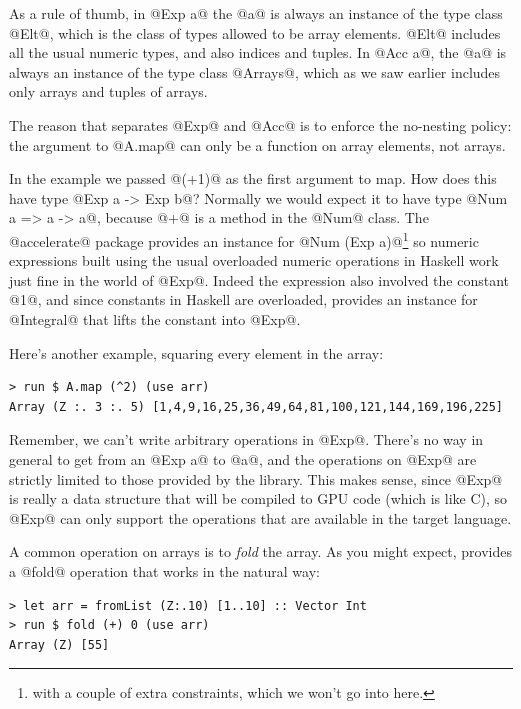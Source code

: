 As a rule of thumb, in @Exp a@ the @a@ is always an instance of the
type class @Elt@, which is the class of types allowed to be array
elements.  @Elt@ includes all the usual numeric types, and also
indices and tuples.  In @Acc a@, the @a@ is always an instance of the
type class @Arrays@, which as we saw earlier includes only arrays and
tuples of arrays.

The reason that \acc{} separates @Exp@ and @Acc@ is to enforce the
no-nesting policy: the argument to @A.map@ can only be a function on
array elements, not arrays.

In the example we passed @(+1)@ as the first argument to map.  How
does this have type @Exp a -> Exp b@?  Normally we would expect it to
have type @Num a => a -> a@, because @+@ is a method in the @Num@
class.  The @accelerate@ package provides an instance for @Num (Exp a)@\footnote{with a couple of extra constraints, which we won't go
  into here.}
so numeric expressions built using the usual overloaded numeric
operations in Haskell work just fine in the world of @Exp@.  Indeed
the expression also involved the constant @1@, and since constants in
Haskell are overloaded, \acc{} provides an instance for @Integral@
that lifts the constant into @Exp@.

Here's another example, squaring every element in the array:

\begin{verbatim}
> run $ A.map (^2) (use arr)
Array (Z :. 3 :. 5) [1,4,9,16,25,36,49,64,81,100,121,144,169,196,225]
\end{verbatim}

Remember, we can't write arbitrary operations in @Exp@.  There's no
way in general to get from an @Exp a@ to @a@, and the operations on
@Exp@ are strictly limited to those provided by the library.  This
makes sense, since @Exp@ is really a data structure that will be
compiled to GPU code (which is like C), so @Exp@ can only support the
operations that are available in the target language.


A common operation on arrays is to \emph{fold} the array.  As you
might expect, \acc{} provides a @fold@ operation that works in the
natural way:

\begin{verbatim}
> let arr = fromList (Z:.10) [1..10] :: Vector Int
> run $ fold (+) 0 (use arr)
Array (Z) [55]
\end{verbatim}

